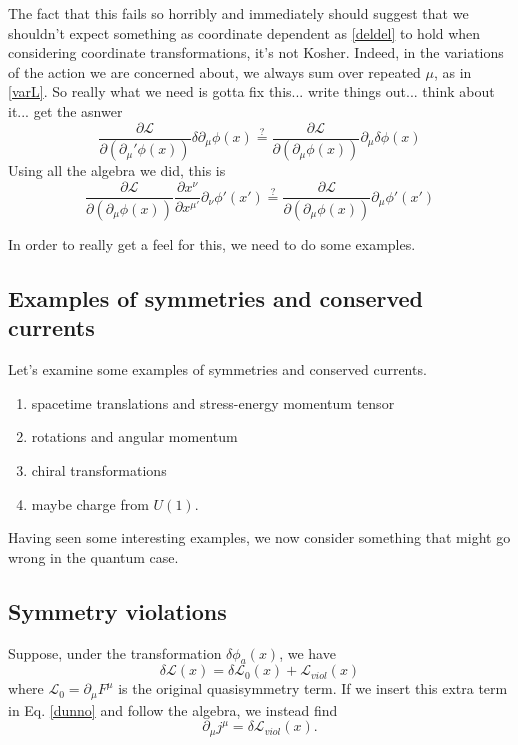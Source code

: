 \documentclass[main.tex]{subfiles}
\begin{document}
The fact that this fails so horribly and immediately should suggest that we shouldn't expect something as coordinate dependent as \ref{deldel} to hold when considering coordinate transformations, it's not Kosher. Indeed, in the variations of the action we are concerned about, we always sum over repeated $\mu$, as in \ref{varL}. So really what we need is gotta fix this... write things out... think about it... get the asnwer
\begin{equation}
\frac{\partial \mathcal{L}}{\partial (\partial_\mu' \phi (x))} \delta \partial_\mu \phi(x) \stackrel{?}{=} \frac{\partial \mathcal{L}}{\partial (\partial_\mu \phi (x))} \partial_\mu \delta  \phi(x)
\end{equation}
Using all the algebra we did, this is
\begin{equation}
\frac{\partial \mathcal{L}}{\partial (\partial_\mu \phi (x))} 
\frac{\partial x^\nu}{\partial x^{\mu'}} \partial_\nu \phi'(x')
\stackrel{?}{=}
\frac{\partial \mathcal{L}}{\partial (\partial_\mu \phi (x))}
\partial_\mu \phi' (x')
\end{equation}

In order to really get a feel for this, we need to do some examples.
\subsection{Examples of symmetries and conserved currents}
Let's examine some examples of symmetries and conserved currents.
\begin{enumerate}
\item spacetime translations and stress-energy momentum tensor

\item rotations and angular momentum

\item chiral transformations

\item maybe charge from $U(1)$.

\end{enumerate}
Having seen some interesting examples, we now consider something that might go wrong in the quantum case.

\subsection{Symmetry violations}
Suppose, under the transformation $\delta \phi_a (x)$, we have
\[
\delta \mathcal{L} (x) = \delta \mathcal{L}_0 (x) + \mathcal{L}_{viol} (x)
\]
where $\mathcal{L}_0 = \partial_\mu F^{\mu}$ is the original quasisymmetry term. If we insert this extra term in Eq. \ref{dunno} and follow the algebra, we instead find
\[
\partial_\mu j^\mu = \delta \mathcal{L}_{viol} (x).
\]
\end{document}
